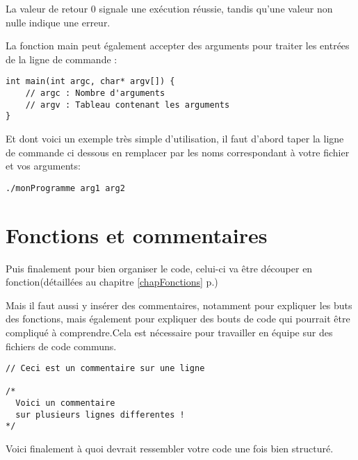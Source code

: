 La valeur de retour 0 signale une exécution réussie, tandis qu'une valeur non nulle indique une erreur.

La fonction main peut également accepter des arguments pour traiter les entrées de la ligne de commande :

\begin{lstlisting}
int main(int argc, char* argv[]) {
	// argc : Nombre d'arguments
	// argv : Tableau contenant les arguments
}
\end{lstlisting}
Et dont voici un exemple très simple d'utilisation, il faut d'abord taper la ligne de commande ci dessous en remplacer par les noms correspondant à votre fichier et vos arguments:

\lstinline[language=bash]|./monProgramme arg1 arg2|



\section{Fonctions et commentaires}

Puis finalement pour bien organiser le code, celui-ci va être découper en fonction(détaillées au chapitre \ref{chapFonctions} p.\pageref{chapFonctions})

Mais il faut aussi y insérer des commentaires, notamment pour expliquer les buts des fonctions, mais également pour expliquer des bouts de code qui pourrait être compliqué à comprendre.Cela est nécessaire pour travailler en équipe sur des fichiers de code communs.

\begin{lstlisting}
// Ceci est un commentaire sur une ligne

/*
  Voici un commentaire 
  sur plusieurs lignes differentes !
*/
\end{lstlisting}

Voici finalement à quoi devrait ressembler votre code une fois bien structuré.

